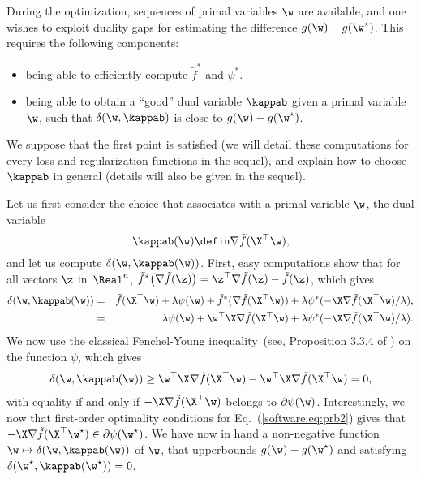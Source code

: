\documentclass[a4paper, 11pt]{article}
\begin{document}
During the optimization, sequences of primal variables $\w$ are available, 
and one wishes to exploit duality gaps for estimating the difference
$g(\w)-g(\w^\star)$. This requires the following components:
\begin{itemize}
   \item being able to efficiently compute $\tilde{f}^\ast$ and $\psi^\ast$.
   \item being able to obtain a ``good'' dual variable $\kappab$ given a primal
      variable $\w$, such that $\delta(\w,\kappab)$ is close to
      $g(\w)-g(\w^\star)$.
\end{itemize}
   
We suppose that the first point is satisfied (we will detail these computations
for every loss and regularization functions in the sequel), and explain how to
choose $\kappab$ in general (details will also be given in the sequel).

Let us first consider the choice that associates with a primal variable $\w$, the
dual variable 
\begin{equation}
   \kappab(\w) \defin \nabla \tilde{f}(\X^\top\w), \label{software:eq:kappab}
\end{equation}
and let us compute $\delta(\w,\kappab(\w))$.
First, easy computations show that for all vectors $\z$ in~$\Real^n$,
$\tilde{f}^\ast\big(\nabla\tilde{f}(\z)\big) = \z^\top\nabla\tilde{f}(\z)-\tilde{f}(\z)$,
which gives
\begin{eqnarray}
   \delta(\w,\kappab(\w)) &=& \tilde{f}(\X^\top \w) + \lambda \psi(\w) + \tilde{f}^\ast(\nabla\tilde{f}(\X^\top\w)) + \lambda\psi^\ast(-\X\nabla\tilde{f}(\X^\top\w)/ \lambda), \\
   &=& \lambda \psi(\w) + \w^\top\X\nabla\tilde{f}(\X^\top\w) + \lambda\psi^\ast(-\X\nabla\tilde{f}(\X^\top\w)/ \lambda). 
\end{eqnarray}
We now use the classical Fenchel-Young inequality~(see, Proposition
3.3.4 of \cite{borwein}) on the function $\psi$, which gives
\begin{displaymath}
   \begin{split}
   \delta(\w,\kappab(\w))  \geq  \w^\top\X\nabla\tilde{f}(\X^\top\w) - \w^\top\X\nabla\tilde{f}(\X^\top\w) = 0,
\end{split}
\end{displaymath}
with equality if and only if $-\X\nabla\tilde{f}(\X^\top\w)$ belongs to
$\partial \psi(\w)$.  Interestingly, we now that first-order optimality
conditions for Eq.~(\ref{software:eq:prb2}) gives that
$-\X\nabla\tilde{f}(\X^\top\w^\star) \in \partial \psi(\w^\star)$.
We have now in hand a non-negative function $\w \mapsto \delta(\w,\kappab(\w))$ of $\w$, that
upperbounds $g(\w)-g(\w^\star)$ and satisfying $\delta(\w^\star,\kappab(\w^\star))=0$.
\end{document}
